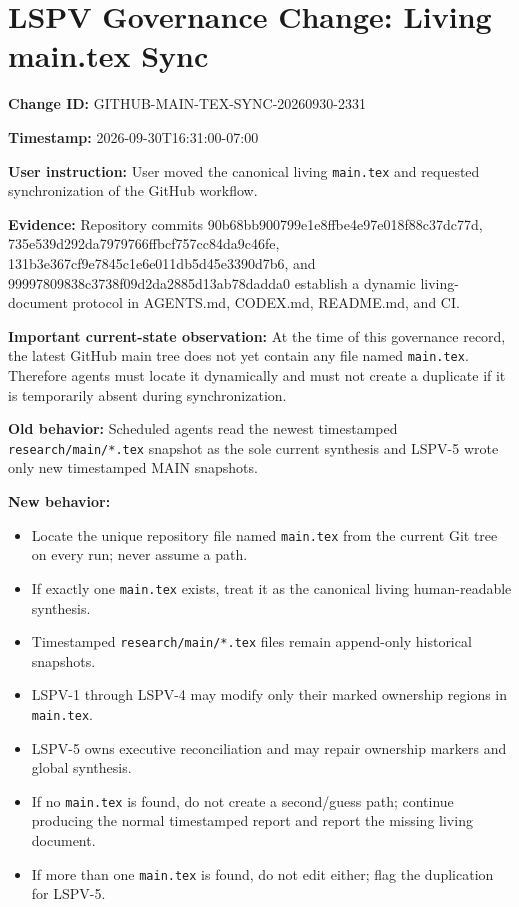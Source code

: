 \documentclass[11pt]{article}
\begin{document}
\section*{LSPV Governance Change: Living main.tex Sync}

\textbf{Change ID:} GITHUB-MAIN-TEX-SYNC-20260930-2331

\textbf{Timestamp:} 2026-09-30T16:31:00-07:00

\textbf{User instruction:} User moved the canonical living \texttt{main.tex} and requested synchronization of the GitHub workflow.

\textbf{Evidence:} Repository commits 90b68bb900799e1e8ffbe4e97e018f88c37dc77d, 735e539d292da7979766ffbcf757cc84da9c46fe, 131b3e367cf9e7845c1e6e011db5d45e3390d7b6, and 99997809838c3738f09d2da2885d13ab78dadda0 establish a dynamic living-document protocol in AGENTS.md, CODEX.md, README.md, and CI.

\textbf{Important current-state observation:} At the time of this governance record, the latest GitHub main tree does not yet contain any file named \texttt{main.tex}. Therefore agents must locate it dynamically and must not create a duplicate if it is temporarily absent during synchronization.

\textbf{Old behavior:} Scheduled agents read the newest timestamped \texttt{research/main/*.tex} snapshot as the sole current synthesis and LSPV-5 wrote only new timestamped MAIN snapshots.

\textbf{New behavior:}
\begin{itemize}
\item Locate the unique repository file named \texttt{main.tex} from the current Git tree on every run; never assume a path.
\item If exactly one \texttt{main.tex} exists, treat it as the canonical living human-readable synthesis.
\item Timestamped \texttt{research/main/*.tex} files remain append-only historical snapshots.
\item LSPV-1 through LSPV-4 may modify only their marked ownership regions in \texttt{main.tex}.
\item LSPV-5 owns executive reconciliation and may repair ownership markers and global synthesis.
\item If no \texttt{main.tex} is found, do not create a second/guess path; continue producing the normal timestamped report and report the missing living document.
\item If more than one \texttt{main.tex} is found, do not edit either; flag the duplication for LSPV-5.
\end{itemize}
\end{document}
